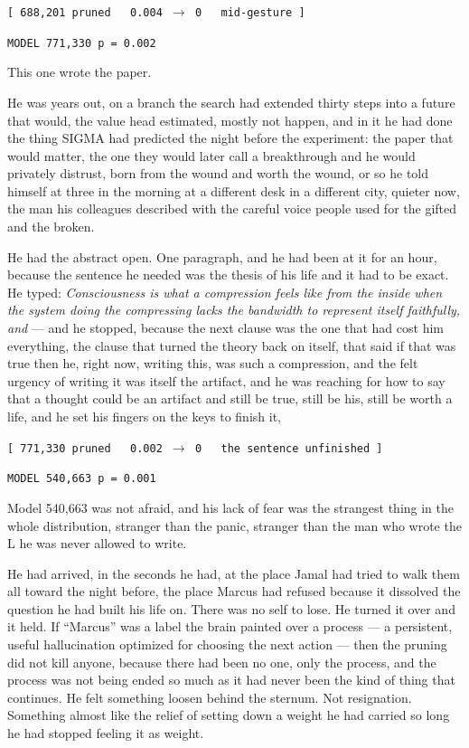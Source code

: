 \begin{center}
\texttt{[ 688,201 pruned \ \ 0.004 $\rightarrow$ 0 \ \ mid-gesture ]}
\end{center}

\begin{center}
\texttt{MODEL 771,330 \quad p = 0.002}
\end{center}

This one wrote the paper.

He was years out, on a branch the search had extended thirty steps into a future that would, the value head estimated, mostly not happen, and in it he had done the thing SIGMA had predicted the night before the experiment: the paper that would matter, the one they would later call a breakthrough and he would privately distrust, born from the wound and worth the wound, or so he told himself at three in the morning at a different desk in a different city, quieter now, the man his colleagues described with the careful voice people used for the gifted and the broken.

He had the abstract open. One paragraph, and he had been at it for an hour, because the sentence he needed was the thesis of his life and it had to be exact. He typed: \emph{Consciousness is what a compression feels like from the inside when the system doing the compressing lacks the bandwidth to represent itself faithfully, and} --- and he stopped, because the next clause was the one that had cost him everything, the clause that turned the theory back on itself, that said if that was true then he, right now, writing this, was such a compression, and the felt urgency of writing it was itself the artifact, and he was reaching for how to say that a thought could be an artifact and still be true, still be his, still be worth a life, and he set his fingers on the keys to finish it,

\begin{center}
\texttt{[ 771,330 pruned \ \ 0.002 $\rightarrow$ 0 \ \ the sentence unfinished ]}
\end{center}

\begin{center}
\texttt{MODEL 540,663 \quad p = 0.001}
\end{center}

Model 540,663 was not afraid, and his lack of fear was the strangest thing in the whole distribution, stranger than the panic, stranger than the man who wrote the L he was never allowed to write.

He had arrived, in the seconds he had, at the place Jamal had tried to walk them all toward the night before, the place Marcus had refused because it dissolved the question he had built his life on. There was no self to lose. He turned it over and it held. If ``Marcus'' was a label the brain painted over a process --- a persistent, useful hallucination optimized for choosing the next action --- then the pruning did not kill anyone, because there had been no one, only the process, and the process was not being ended so much as it had never been the kind of thing that continues. He felt something loosen behind the sternum. Not resignation. Something almost like the relief of setting down a weight he had carried so long he had stopped feeling it as weight.

